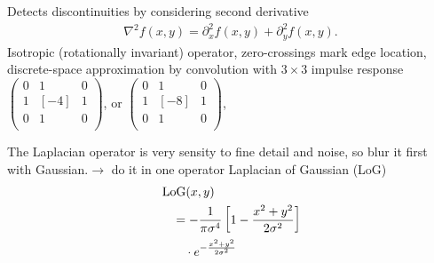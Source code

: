 \begin{compactdesc}
	\item[\lp{Laplacian operator}] Detects discontinuities by considering second derivative
		\begin{gather*}
			\nabla^2 f(x,y)\!=\!\partial_{x}^{2}f(x,y)\!+\!\partial_{y}^{2}f(x,y).
		\end{gather*}
		Isotropic (rotationally invariant) operator, zero-crossings mark edge location, discrete-space approximation by convolution with $3\times 3$ impulse response
		$\left(\begin{smallmatrix}
			0&1&0\\
			1&[-4]&1\\
			0&1&0\\
		\end{smallmatrix}\right)$, or
		$\left(\begin{smallmatrix}
			0&1&0\\
			1&[-8]&1\\
			0&1&0\\
		\end{smallmatrix}\right)$,
	\item[\lp{Laplacian of Gaussian}]
		The Laplacian operator is very sensity to fine detail and noise, so blur it first with Gaussian.$\to$ do it in one operator Laplacian of Gaussian (LoG)
		\begin{align*}
			&\operatorname*{LoG}(x,y)\\
			&\quad=-\frac{1}{\pi\sigma^4}\left[ 1-\frac{x^2+y^2}{2\sigma^2} \right]\\
			&\qquad \cdot e^{-\frac{x^2+y^2}{2\sigma^2}}
		\end{align*}
\end{compactdesc}
